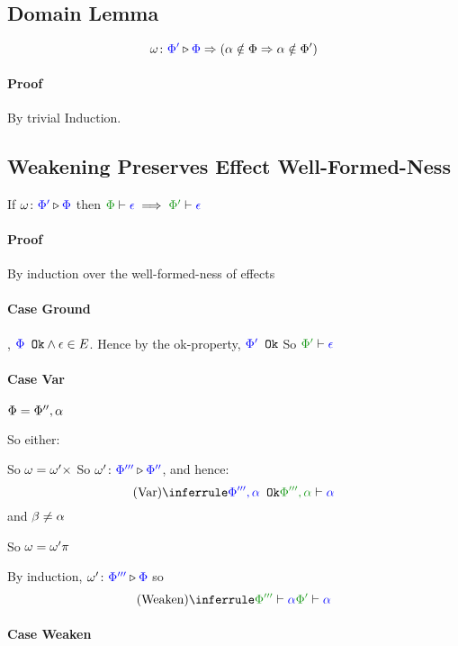 {    \subsection{Domain Lemma}

    $$\omega \colon {\color{blue}\Phi'} \triangleright {\color {blue} \Phi} \Rightarrow (\alpha\notin\Phi \Rightarrow \alpha\notin\Phi')$$

    \paragraph{Proof}
    By trivial Induction.
   
    \subsection{Weakening Preserves Effect Well-Formed-Ness}
    If $\omega \colon {\color{blue}\Phi'} \triangleright {\color {blue} \Phi}$ then $\wellformed{\P}{\e}\implies\wellformed{\P'}{\e}$

    \paragraph{Proof}
    By induction over the well-formed-ness of effects
    \paragraph{Case Ground}
    \bi, ${\color{blue} \Phi} \texttt{ Ok}\wedge\epsilon\in E$.
    Hence by the ok-property, ${\color{blue} \Phi'} \texttt{ Ok}$
    So $\wellformed{\P'}{\e}$

    \paragraph{Case Var}

    $\Phi = \Phi'', \alpha$

    So either:

        So $\omega = \omega'\times$
        So $\omega' \colon {\color{blue}\Phi'''} \triangleright {\color {blue} \Phi''}$, and hence:
        \begin{equation}
            \ntreeruleI{Var}{\ok{\P''', \a}}{\wellformed{\P''',\a}{\a}}
        \end{equation}
     and $\beta \neq\alpha$

    So $\omega = \omega'\pi$

    By induction, $\omega' \colon {\color{blue}\Phi'''} \triangleright {\color {blue} \Phi}$
    so \begin{equation}
        \ntreeruleI{Weaken}{\wellformed{\P'''}{\a}}{\wellformed{\P'}{\a}}
    \end{equation}

    \paragraph{Case Weaken}

}
